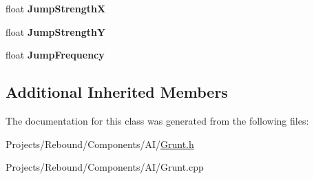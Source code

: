 \begin{DoxyCompactItemize}
\item 
\hypertarget{classDCEngine_1_1Components_1_1Grunt_af0649996cdffb8e6e00f2f977bfd9178}{float {\bfseries Jump\-Strength\-X}}\label{classDCEngine_1_1Components_1_1Grunt_af0649996cdffb8e6e00f2f977bfd9178}

\item 
\hypertarget{classDCEngine_1_1Components_1_1Grunt_a386f0e2c34c43590eb60fd2af8bb9e38}{float {\bfseries Jump\-Strength\-Y}}\label{classDCEngine_1_1Components_1_1Grunt_a386f0e2c34c43590eb60fd2af8bb9e38}

\item 
\hypertarget{classDCEngine_1_1Components_1_1Grunt_a2d9ebb3d96649d7c40d24e8d5d5be663}{float {\bfseries Jump\-Frequency}}\label{classDCEngine_1_1Components_1_1Grunt_a2d9ebb3d96649d7c40d24e8d5d5be663}

\end{DoxyCompactItemize}
\subsection*{Additional Inherited Members}


The documentation for this class was generated from the following files\-:\begin{DoxyCompactItemize}
\item 
Projects/\-Rebound/\-Components/\-A\-I/\hyperlink{Grunt_8h}{Grunt.\-h}\item 
Projects/\-Rebound/\-Components/\-A\-I/Grunt.\-cpp\end{DoxyCompactItemize}
